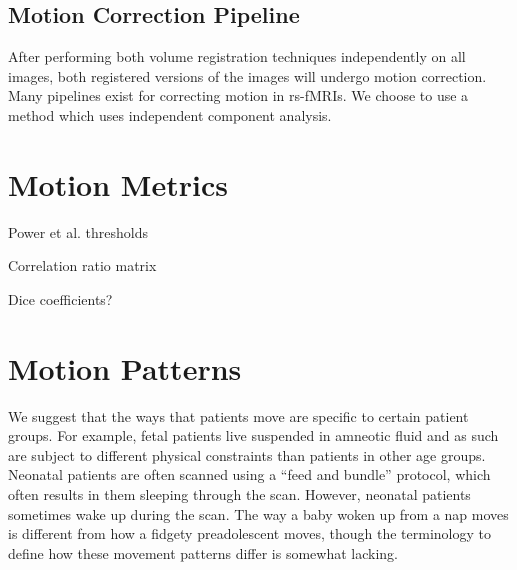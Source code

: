 \subsection{Motion Correction Pipeline}

After performing both volume registration techniques independently on all images, both registered versions of the images will undergo motion correction. Many pipelines exist for correcting motion in rs-fMRIs. We choose to use a method which uses independent component analysis. 

\section{Motion Metrics}

Power et al. thresholds


Correlation ratio matrix


Dice coefficients?

\section{Motion Patterns} 

We suggest that the ways that patients move are specific to certain patient groups. For example, fetal patients live suspended in amneotic fluid and as such are subject to different physical constraints than patients in other age groups. Neonatal patients are often scanned using a ``feed and bundle'' protocol, which often results in them sleeping through the scan. However, neonatal patients sometimes wake up during the scan. The way a baby woken up from a nap moves is different from how a fidgety preadolescent moves, though the terminology to define how these movement patterns differ is somewhat lacking. 

